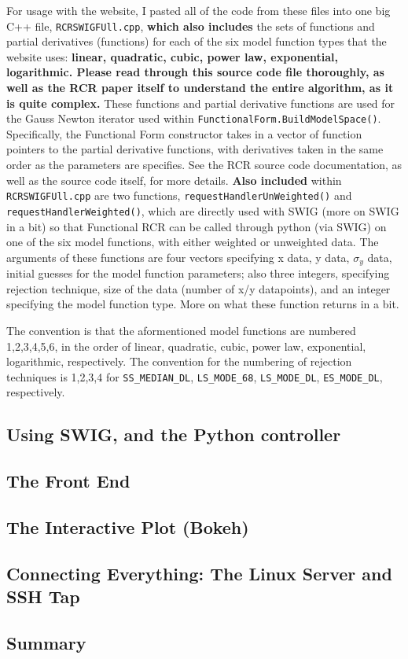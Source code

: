\documentclass[12pt]{article}
\begin{document}
\par For usage with the website, I pasted all of the code from these files into one big C++ file, \texttt{RCRSWIGFUll.cpp}, \textbf{which also includes} the sets of functions and partial derivatives (functions) for each of the six model function types that the website uses: \textbf{linear, quadratic, cubic, power law, exponential, logarithmic. Please read through this source code file thoroughly, as well as the RCR paper itself to understand the entire algorithm, as it is quite complex.} These functions and partial derivative functions are used for the Gauss Newton iterator used within \texttt{FunctionalForm.BuildModelSpace()}. Specifically, the Functional Form constructor takes in a vector of function pointers to the partial derivative functions, with derivatives taken in the same order as the parameters are specifies. See the RCR source code documentation, as well as the source code itself, for more details. \textbf{Also included} within \texttt{RCRSWIGFUll.cpp} are two functions, \texttt{requestHandlerUnWeighted()} and \texttt{requestHandlerWeighted()}, which are directly used with SWIG (more on SWIG in a bit) so that Functional RCR can be called through python (via SWIG) on one of the six model functions, with either weighted or unweighted data. The arguments of these functions are four vectors specifying x data, y data, $\sigma_y$ data, initial guesses for the model function parameters; also three integers, specifying rejection technique, size of the data (number of x/y datapoints), and an integer specifying the model function type. More on what these function returns in a bit.
\par The convention is that the aformentioned model functions are numbered 1,2,3,4,5,6, in the order of linear, quadratic, cubic, power law, exponential, logarithmic, respectively. The convention for the numbering of rejection techniques is 1,2,3,4 for \texttt{SS\_MEDIAN\_DL}, \texttt{LS\_MODE\_68}, \texttt{LS\_MODE\_DL},
\texttt{ES\_MODE\_DL}, respectively.
\subsection{Using SWIG, and the Python controller}
\subsection{The Front End}
\subsection{The Interactive Plot (Bokeh)}
\subsection{Connecting Everything: The Linux Server and SSH Tap}
\subsection{Summary}
\end{document}
